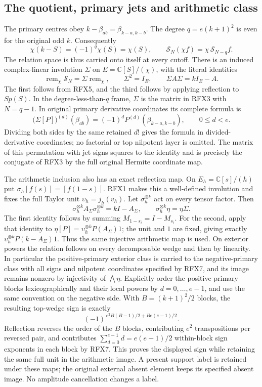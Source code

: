 \documentclass[11pt,a4paper]{article}
\begin{document}
\subsection{The quotient, primary jets and arithmetic class}
The primary centres obey
$k-\beta_{ab}=\beta_{k-a,k-b}$. The degree
$q=e(k+1)^2$ is even for the original odd $k$. Consequently
\[
 \chi(k-S)=(-1)^q\chi(S)=\chi(S),\qquad
 \mathscr S_N(\chi f)=\chi\,\mathscr S_{N-q}f.
 \tag{RFX5}
\]
The relation space is thus carried onto itself at every cutoff.
There is an induced complex-linear involution $\Sigma$ on
$E=\mathbb C[S]/(\chi)$, with the literal identities
\[
 \operatorname{rem}_\chi\mathscr S_N
     =\Sigma\operatorname{rem}_\chi,\qquad
 \Sigma^2=I_E,\qquad \Sigma A\Sigma=kI_E-A.
 \tag{RFX6}
\]
The first follows from RFX5, and the third follows by applying
reflection to $S p(S)$. In the degree-less-than-$q$ frame, $\Sigma$
is the matrix in RFX3 with $N=q-1$. In original primary derivative
coordinates its complete formula is
\[
 \bigl(\Sigma[P]\bigr)^{(d)}(\beta_{ab})
       =(-1)^dP^{(d)}(\beta_{k-a,k-b}),\qquad 0\le d<e.
 \tag{RFX7}
\]
Dividing both sides by the same retained $d!$ gives the formula in
divided-derivative coordinates; no factorial or top nilpotent layer
is omitted. The matrix of this permutation with jet signs squares
to the identity and is precisely the conjugate of RFX3 by the full
original Hermite coordinate map.

The arithmetic inclusion also has an exact reflection map. On
$E_h=\mathbb C[s]/(h)$ put $\sigma_h[f(s)]=[f(1-s)]$.
RFX1 makes this a well-defined involution and fixes the full Taylor
unit $\upsilon_h=j_h(v_h)$. Let
$\sigma_h^{\otimes k}$ act on every tensor factor. Then
\[
 \sigma_h^{\otimes k} A_\Sigma\sigma_h^{\otimes k}
      =kI-A_\Sigma,\qquad
 \sigma_h^{\otimes k}\eta=\eta\Sigma.
 \tag{RFX8}
\]
The first identity follows by summing $M_{1-s_i}=I-M_{s_i}$.
For the second, apply that identity to
$\eta[P]=\upsilon_h^{\otimes k}P(A_\Sigma)1$; the unit and $1$
are fixed, giving exactly $\upsilon_h^{\otimes k}P(k-A_\Sigma)1$.
Thus the same injective arithmetic map is used. On exterior powers
the relation follows on every decomposable wedge and then by
linearity. In particular the positive-primary exterior class is
carried to the negative-primary class with all signs and nilpotent
coordinates specified by RFX7, and its image remains nonzero by
injectivity of $\bigwedge\eta$. Explicitly order the positive primary
blocks lexicographically and their local powers by $d=0,\ldots,e-1$,
and use the same convention on the negative side. With
$B=(k+1)^2/2$ blocks, the resulting top-wedge sign is exactly
\[
 (-1)^{\,e^2B(B-1)/2+B e(e-1)/2}.
\]
Reflection reverses the order of the $B$ blocks, contributing
$e^2$ transpositions per reversed pair, and contributes
$\sum_{d=0}^{e-1}d=e(e-1)/2$ within-block sign exponents in each
block by RFX7. This proves the displayed sign while retaining
the same full unit in the arithmetic image.
A present support label is retained
under these maps; the original external absent element keeps its
specified absent image. No amplitude cancellation changes a label.
\end{document}
